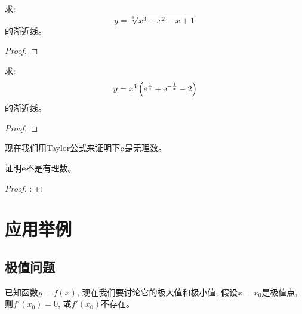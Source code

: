 \begin{example}
    求:
    \begin{equation*}
        y = \sqrt[3]{x^3-x^2-x+1}
    \end{equation*}
    的渐近线。
\end{example}
\begin{proof}
    
\end{proof}

\begin{example}
    求:
    \begin{equation*}
        y = x^3\left(e^\frac{1}{x}+\mathrm{e}^{-\frac{1}{x}}-2\right)
    \end{equation*}
    的渐近线。
\end{example}
\begin{proof}
    
\end{proof}

现在我们用Taylor公式来证明下$\mathrm{e}$是无理数。
\begin{example}
    证明$\mathrm{e}$不是有理数。
\end{example}
\begin{proof}
    :
\end{proof}

\section{应用举例}
\subsection{极值问题}
已知函数$y = f(x)$, 现在我们要讨论它的极大值和极小值, 假设$x = x_0$是极值点, 则$f'(x_0) = 0$, 或$f'(x_0)$不存在。

